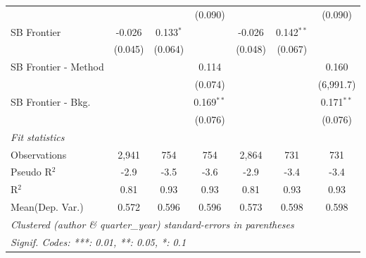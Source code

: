 \begin{tabular}{lcccccc}
                        &         &              & (0.090)      &         &              & (0.090)\\   
   SB Frontier          & -0.026  & 0.133$^{*}$  &              & -0.026  & 0.142$^{**}$ &   \\   
                        & (0.045) & (0.064)      &              & (0.048) & (0.067)      &   \\   
   SB Frontier - Method &         &              & 0.114        &         &              & 0.160\\   
                        &         &              & (0.074)      &         &              & (6,991.7)\\   
   SB Frontier - Bkg.   &         &              & 0.169$^{**}$ &         &              & 0.171$^{**}$\\   
                        &         &              & (0.076)      &         &              & (0.076)\\   
   \midrule
   \emph{Fit statistics}\\
   Observations         & 2,941   & 754          & 754          & 2,864   & 731          & 731\\  
   Pseudo R$^2$         & -2.9    & -3.5         & -3.6         & -2.9    & -3.4         & -3.4\\  
   R$^2$                & 0.81    & 0.93         & 0.93         & 0.81    & 0.93         & 0.93\\  
Mean(Dep. Var.) & 0.572 & 0.596 & 0.596 & 0.573 & 0.598 & 0.598 \\
   \midrule \midrule
   \multicolumn{7}{l}{\emph{Clustered (author \& quarter\_year) standard-errors in parentheses}}\\
   \multicolumn{7}{l}{\emph{Signif. Codes: ***: 0.01, **: 0.05, *: 0.1}}\\
\end{tabular}
\par\endgroup
